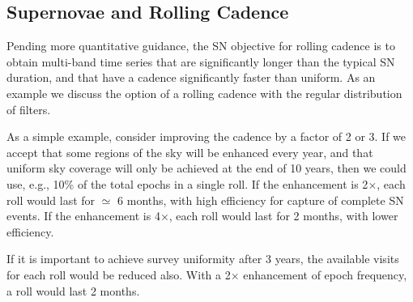 %
%

\subsection{Supernovae and Rolling Cadence}
\label{sec:rolling:supernovae}


Pending more quantitative guidance, the SN objective for rolling cadence
is to obtain multi-band time series that are significantly longer than
the typical SN duration, and that have a cadence significantly faster
than uniform. As an example we discuss the option of a rolling cadence
with the regular distribution of filters.

As a simple example, consider improving the cadence by a factor of 2 or
3.  If we accept that some regions of the sky will be enhanced every
year, and that uniform sky coverage will only be achieved at the end of 10
years, then we could use, e.g., 10\% of the total epochs in a single
roll.  If the enhancement is 2$\times$, each roll would last for
$\simeq$ 6 months, with high efficiency for capture of complete SN
events.  If the enhancement is 4$\times$, each roll would last for 2
months, with lower efficiency.

If it is important to achieve survey uniformity after 3 years, the
available visits for each roll would be reduced also.  With a 2$\times$
enhancement of epoch frequency, a roll would last 2 months.

